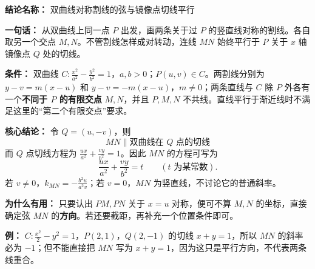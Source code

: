 \textbf{结论名称：} 双曲线对称割线的弦与镜像点切线平行

\textbf{一句话：} 从双曲线上同一点 $P$ 出发，画两条关于过 $P$ 的竖直线对称的割线。各自取另一个交点 $M,N$。不管割线怎样成对转动，连线 $MN$ 始终平行于 $P$ 关于 $x$ 轴镜像点 $Q$ 处的切线。

\textbf{条件：} 双曲线 $C:\frac{x^2}{a^2}-\frac{y^2}{b^2}=1$，$a,b>0$；$P(u,v)\in C$。两割线分别为 $y-v=m(x-u)$ 和 $y-v=-m(x-u)$，$m\neq0$；两条直线与 $C$ 除 $P$ 外各有一个\textbf{不同于 $P$ 的有限交点} $M,N$，并且 $P,M,N$ 不共线。直线平行于渐近线时不满足这里的“第二个有限交点”要求。

\textbf{核心结论：} 令 $Q=(u,-v)$，则
\[
\boxed{MN\parallel \text{双曲线在 }Q\text{ 点的切线}}
\]
而 $Q$ 点切线方程为 $\frac{ux}{a^2}+\frac{vy}{b^2}=1$。因此 $MN$ 的方程可写为
\[
\boxed{\frac{ux}{a^2}+\frac{vy}{b^2}=t}\qquad (t\text{ 为某常数}).
\]
若 $v\ne0$，$k_{MN}=-\frac{b^2u}{a^2v}$；若 $v=0$，$MN$ 为竖直线，不讨论它的普通斜率。

\textbf{为什么有用：} 只要认出 $PM,PN$ 关于 $x=u$ 对称，便可不算 $M,N$ 的坐标，直接确定弦 $MN$ 的\textbf{方向}。若还要截距，再补充一个位置条件即可。

\textbf{例：} $C:\frac{x^2}{2}-y^2=1$，$P(2,1)$，$Q(2,-1)$ 的切线 $x+y=1$，所以 $MN$ 的斜率必为 $-1$；但不能直接把 $MN$ 写为 $x+y=1$，因为这只是平行方向，不代表两条线重合。

